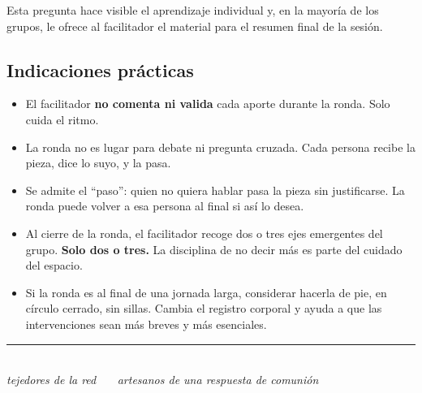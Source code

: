 \documentclass[11pt, a4paper]{article}
\begin{document}
\vspace{0.5em}

Esta pregunta hace visible el aprendizaje individual y, en la mayoría de los grupos, le ofrece al facilitador el material para el resumen final de la sesión.

\subsection*{Indicaciones prácticas}

\begin{itemize}
  \item El facilitador \textbf{no comenta ni valida} cada aporte durante la ronda. Solo cuida el ritmo.
  \item La ronda no es lugar para debate ni pregunta cruzada. Cada persona recibe la pieza, dice lo suyo, y la pasa.
  \item Se admite el ``paso'': quien no quiera hablar pasa la pieza sin justificarse. La ronda puede volver a esa persona al final si así lo desea.
  \item Al cierre de la ronda, el facilitador recoge dos o tres ejes emergentes del grupo. \textbf{Solo dos o tres.} La disciplina de no decir más es parte del cuidado del espacio.
  \item Si la ronda es al final de una jornada larga, considerar hacerla de pie, en círculo cerrado, sin sillas. Cambia el registro corporal y ayuda a que las intervenciones sean más breves y más esenciales.
\end{itemize}

\vspace{2em}

\begin{center}
{\color{regla}\rule{0.35\linewidth}{0.5pt}}\\
\vspace{0.6em}
{\color{tenue}\itshape\small tejedores de la red \ \textbullet\ \ artesanos de una respuesta de comunión}
\end{center}
\end{document}
